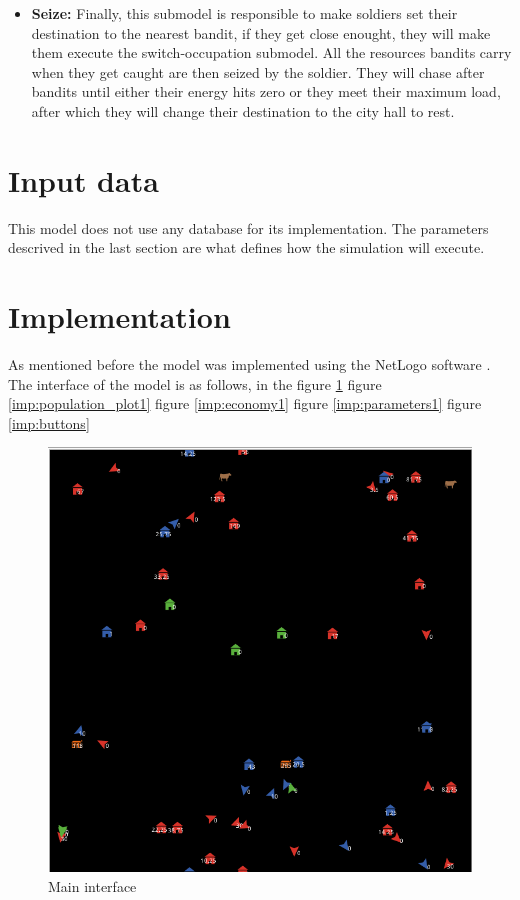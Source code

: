 \documentclass{wscpaperproc}
\begin{document}
\begin{itemize}
    \item \textbf{Seize:} Finally, this submodel is responsible to make
    soldiers set their destination to the nearest bandit, if they get close
    enought, they will make them execute the switch-occupation submodel. All
    the resources bandits carry when they get caught are then seized by the
    soldier. They will chase after bandits until either their energy hits zero
    or they meet their maximum load, after which they will change their
    destination to the city hall to rest.

\end{itemize}

\section{Input data}

This model does not use any database for its implementation. The parameters
descrived in the last section are what defines how the simulation will execute.

\section{Implementation}


As mentioned before the model was implemented using the NetLogo software
\cite{netlogo}. The interface of the model is as follows, in the
figure \ref{imp:main_interface1}
figure \ref{imp:population_plot1}
figure \ref{imp:economy1}
figure \ref{imp:parameters1}
figure \ref{imp:buttons}

\newpage

\begin{figure}[h!]
    \centering
    \includegraphics[scale=0.5]{Images/Interface1}
    \caption{Main interface}
    \label{imp:main_interface1}
\end{figure}
\end{document}
